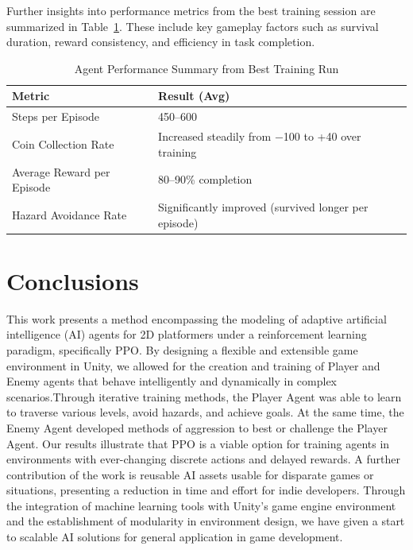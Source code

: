 \documentclass[12pt,oneside,openright,a4paper]{cpe-english-project}
\begin{document}
Further insights into performance metrics from the best training session are summarized in Table~\ref{tab:performance_summary}. These include key gameplay factors such as survival duration, reward consistency, and efficiency in task completion.

\begin{table}[h]
\centering
\caption{Agent Performance Summary from Best Training Run}
\label{tab:performance_summary}
\begin{tabular}{|l|p{8cm}|}
\hline
\textbf{Metric} & \textbf{Result (Avg)} \\
\hline
Steps per Episode & 450–600 \\
\hline
Coin Collection Rate & Increased steadily from −100 to +40 over training \\
\hline
Average Reward per Episode & 80–90\% completion \\
\hline
Hazard Avoidance Rate & Significantly improved (survived longer per episode) \\
\hline
\end{tabular}
\end{table}


\chapter{Conclusions}
This work presents a method encompassing the modeling of adaptive artificial intelligence (AI) agents for 2D platformers under a reinforcement learning paradigm, specifically PPO. By designing a flexible and extensible game environment in Unity, we allowed for the creation and training of Player and Enemy agents that behave intelligently and dynamically in complex scenarios.Through iterative training methods, the Player Agent was able to learn to traverse various levels, avoid hazards, and achieve goals. At the same time, the Enemy Agent developed methods of aggression to best or challenge the Player Agent. Our results illustrate that PPO is a viable option for training agents in environments with ever-changing discrete actions and delayed rewards. A further contribution of the work is reusable AI assets usable for disparate games or situations, presenting a reduction in time and effort for indie developers. Through the integration of machine learning tools with Unity's game engine environment and the establishment of modularity in environment design, we have given a start to scalable AI solutions for general application in game development.
\end{document}
